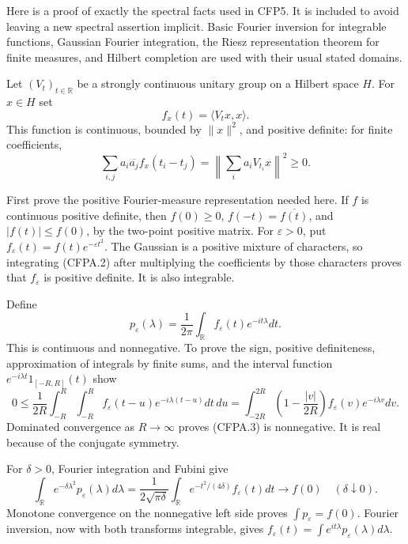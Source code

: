 Here is a proof of exactly the spectral facts used in CFP5. It is
included to avoid leaving a new spectral assertion implicit. Basic
Fourier inversion for integrable functions, Gaussian Fourier
integration, the Riesz representation theorem for finite measures, and
Hilbert completion are used with their usual stated domains.

Let \((V_t)_{t\in\mathbb R}\) be a strongly continuous unitary group on
a Hilbert space \(H\). For \(x\in H\) set \[
f_x(t)=\langle V_tx,x\rangle.
\tag{CFPA.1}
\] This function is continuous, bounded by \(\|x\|^2\), and positive
definite: for finite coefficients, \[
\sum_{i,j}a_i\overline{a_j}f_x(t_i-t_j)
=\left\|\sum_i a_iV_{t_i}x\right\|^2\ge0.
\tag{CFPA.2}
\]

First prove the positive Fourier-measure representation needed here. If
\(f\) is continuous positive definite, then \(f(0)\ge0\),
\(f(-t)=\overline{f(t)}\), and \(|f(t)|\le f(0)\), by the two-point
positive matrix. For \(\varepsilon>0\), put
\(f_\varepsilon(t)=f(t)e^{-\varepsilon t^2}\). The Gaussian is a
positive mixture of characters, so integrating (CFPA.2) after
multiplying the coefficients by those characters proves that
\(f_\varepsilon\) is positive definite. It is also integrable.

Define \[
p_\varepsilon(\lambda)=\frac1{2\pi}
\int_{\mathbb R}f_\varepsilon(t)e^{-it\lambda}dt.
\tag{CFPA.3}
\] This is continuous and nonnegative. To prove the sign, positive
definiteness, approximation of integrals by finite sums, and the
interval function \(e^{-i\lambda t}1_{[-R,R]}(t)\) show \[
0\le\frac1{2R}\int_{-R}^R\int_{-R}^R
f_\varepsilon(t-u)e^{-i\lambda(t-u)}dt\,du
=\int_{-2R}^{2R}
\left(1-\frac{|v|}{2R}\right)
f_\varepsilon(v)e^{-i\lambda v}dv.
\] Dominated convergence as \(R\to\infty\) proves (CFPA.3) is
nonnegative. It is real because of the conjugate symmetry.

For \(\delta>0\), Fourier integration and Fubini give \[
\int_{\mathbb R}e^{-\delta\lambda^2}p_\varepsilon(\lambda)d\lambda
=\frac1{2\sqrt{\pi\delta}}
\int_{\mathbb R}e^{-t^2/(4\delta)}f_\varepsilon(t)dt
\longrightarrow f(0)
\quad(\delta\downarrow0).
\tag{CFPA.4}
\] Monotone convergence on the nonnegative left side proves
\(\int p_\varepsilon=f(0)\). Fourier inversion, now with both transforms
integrable, gives
\(f_\varepsilon(t)=\int e^{it\lambda}p_\varepsilon(\lambda)d\lambda\).

